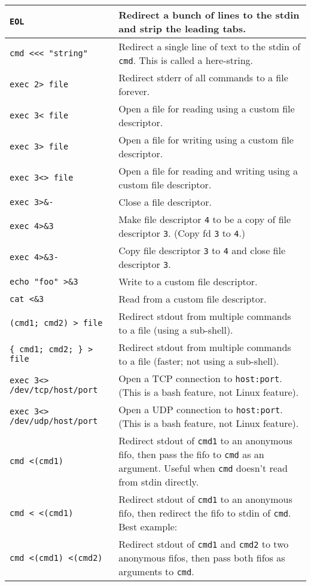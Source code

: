 \documentclass[9pt]{memoir}
\begin{document}
\begin{tabular}{|m{5.5cm}|m{12.2cm}|}
{\verb|EOL|
} & Redirect a bunch of lines to the stdin and strip the leading tabs. \\
\hline
\verb|cmd <<< "string"| & Redirect a single line of text to the stdin of \verb|cmd|. This is called a here-string. \\
\hline
\verb|exec 2> file| & Redirect stderr of all commands to a file forever. \\
\hline
\verb|exec 3< file| & Open a file for reading using a custom file descriptor. \\
\hline
\verb|exec 3> file| & Open a file for writing using a custom file descriptor. \\
\hline
\verb|exec 3<> file| & Open a file for reading and writing using a custom file descriptor. \\
\hline
\verb|exec 3>&-| & Close a file descriptor. \\
\hline
\verb|exec 4>&3| & Make file descriptor \verb|4| to be a copy of file descriptor \verb|3|. (Copy fd \verb|3| to \verb|4|.) \\
\hline
\verb|exec 4>&3-| & Copy file descriptor \verb|3| to \verb|4| and close file descriptor \verb|3|. \\
\hline
\verb|echo "foo" >&3| & Write to a custom file descriptor. \\
\hline
\verb|cat <&3| & Read from a custom file descriptor. \\
\hline
\verb|(cmd1; cmd2) > file| & Redirect stdout from multiple commands to a file (using a sub-shell). \\
\hline
\verb|{ cmd1; cmd2; } > file| & Redirect stdout from multiple commands to a file (faster; not using a sub-shell). \\
\hline
\verb|exec 3<> /dev/tcp/host/port| & Open a TCP connection to \verb|host:port|. (This is a bash feature, not Linux feature). \\
\hline
\verb|exec 3<> /dev/udp/host/port| & Open a UDP connection to \verb|host:port|. (This is a bash feature, not Linux feature). \\
\hline
\verb|cmd <(cmd1)| & Redirect stdout of \verb|cmd1| to an anonymous fifo, then pass the fifo to \verb|cmd| as an argument. Useful when \verb|cmd| doesn't read from stdin directly. \\
\hline
\verb|cmd < <(cmd1)| & Redirect stdout of \verb|cmd1| to an anonymous fifo, then redirect the fifo to stdin of \verb|cmd|. Best example: \verb\diff <(find /path1 | sort) <(find /path2 | sort)\. \\
\hline
\verb|cmd <(cmd1) <(cmd2) | & Redirect stdout of \verb|cmd1| and \verb|cmd2| to two anonymous fifos, then pass both fifos as arguments to \verb|cmd|. \\

\end{tabular}
\end{document}
